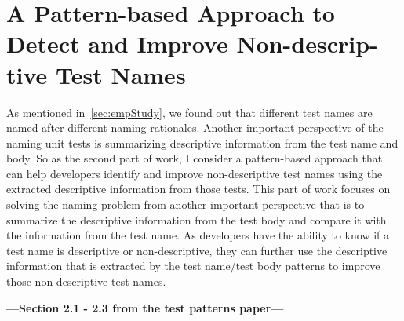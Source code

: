 \section{A Pattern-based Approach to Detect and Improve Non-descrip-\\tive Test Names}
\label{sec:test-pattern-section}

As mentioned in~\cref{sec:empStudy}, we found out that different test names are named after different naming rationales.
%
Another important perspective of the naming unit tests is summarizing descriptive information from the test name and body.
%
So as the second part of work, I consider a pattern-based approach that can help developers identify and improve non-descriptive test names using the extracted descriptive information from those tests.
%
This part of work focuses on solving the naming problem from another important perspective that is to summarize the descriptive information from the test body and compare it with the information from the test name.
%
As developers have the ability to know if a test name is descriptive or non-descriptive, they can further use the descriptive information that is extracted by the test name\slash test body patterns to improve those non-descriptive test names.

\textbf{---Section 2.1 - 2.3 from the test patterns paper---}





